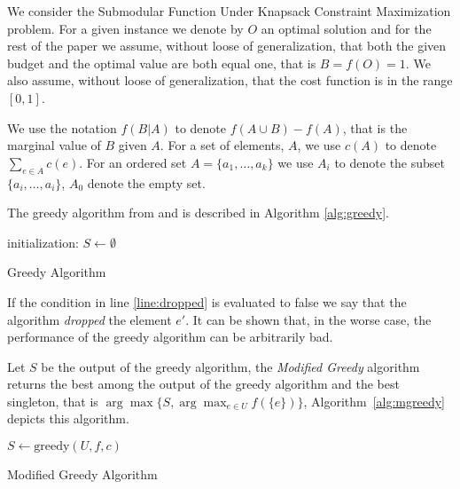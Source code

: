 We consider the Submodular Function Under
Knapsack Constraint Maximization problem.
For a given instance we denote by $O$ an optimal solution and for the rest of the 
paper we assume, without loose of generalization, that both the 
given budget and the optimal value are both equal one, that is $B = f(O) = 1$.
We also assume, without loose of generalization, 
that the cost function is in the range $[0, 1]$.
 
We use the notation $f(B|A)$ to denote $f(A \cup B) - f(A)$, that is the marginal value of $B$
given $A$. 
For a set of elements, $A$, we use $c(A)$ to denote $\sum_{e \in A}c(e)$.
For an ordered set $A = \{a_1, \dots, a_k\}$ we use $A_i$ to denote the subset 
$\{a_i, \dots, a_i\}$, $A_0$ denote the empty set. 

The greedy algorithm from \cite{khuller1999budgeted} and \cite{krause2005note}
is described in Algorithm \ref{alg:greedy}.

\begin{algorithm}[H]
\label{alg:greedy}



initialization: $S \leftarrow \emptyset$
\\
\caption{Greedy Algorithm}
\end{algorithm}
 
If the condition in line \ref{line:dropped} is evaluated to false we say that the algorithm 
\emph{dropped} the element $e'$.
It can be shown that, in the worse case, the performance of the greedy algorithm 
can be arbitrarily bad.

Let $S$ be the output of the greedy algorithm, the \emph{Modified Greedy} algorithm 
returns the best among the output of the greedy algorithm
and the best singleton, that is $\arg\max\{S, \displaystyle{\arg\max_{e \in U}}f(\{e\})\}$,
Algorithm~\ref{alg:mgreedy} depicts this algorithm.  

\begin{algorithm}[H]
\label{alg:mgreedy}



$S \leftarrow \text{greedy}(U, f, c)$
\\
\caption{Modified Greedy Algorithm}
\end{algorithm}

